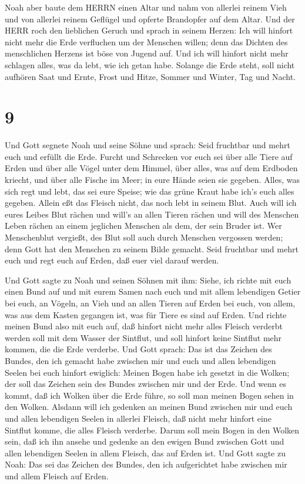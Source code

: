  Noah aber baute dem HERRN einen Altar und nahm von
allerlei reinem Vieh und von allerlei reinem Geflügel und opferte
Brandopfer auf dem Altar.  Und der HERR roch den lieblichen
Geruch und sprach in seinem Herzen: Ich will hinfort nicht mehr die Erde
verfluchen um der Menschen willen; denn das Dichten des menschlichen
Herzens ist böse von Jugend auf. Und ich will hinfort nicht mehr
schlagen alles, was da lebt, wie ich getan habe.  Solange
die Erde steht, soll nicht aufhören Saat und Ernte, Frost und Hitze,
Sommer und Winter, Tag und Nacht.

\hypertarget{section-8}{%
\section{9}\label{section-8}}

 Und Gott segnete Noah und seine Söhne und sprach: Seid
fruchtbar und mehrt euch und erfüllt die Erde.  Furcht und
Schrecken vor euch sei über alle Tiere auf Erden und über alle Vögel
unter dem Himmel, über alles, was auf dem Erdboden kriecht, und über
alle Fische im Meer; in eure Hände seien sie gegeben. 
Alles, was sich regt und lebt, das sei eure Speise; wie das grüne Kraut
habe ich's euch alles gegeben.  Allein eßt das Fleisch
nicht, das noch lebt in seinem Blut.  Auch will ich eures
Leibes Blut rächen und will's an allen Tieren rächen und will des
Menschen Leben rächen an einem jeglichen Menschen als dem, der sein
Bruder ist.  Wer Menschenblut vergießt, des Blut soll auch
durch Menschen vergossen werden; denn Gott hat den Menschen zu seinem
Bilde gemacht.  Seid fruchtbar und mehrt euch und regt euch
auf Erden, daß euer viel darauf werden.

 Und Gott sagte zu Noah und seinen Söhnen mit ihm:
 Siehe, ich richte mit euch einen Bund auf und mit eurem
Samen nach euch  und mit allem lebendigen Getier bei euch,
an Vögeln, an Vieh und an allen Tieren auf Erden bei euch, von allem,
was aus dem Kasten gegangen ist, was für Tiere es sind auf Erden.
 Und richte meinen Bund also mit euch auf, daß hinfort
nicht mehr alles Fleisch verderbt werden soll mit dem Wasser der
Sintflut, und soll hinfort keine Sintflut mehr kommen, die die Erde
verderbe.  Und Gott sprach: Das ist das Zeichen des Bundes,
den ich gemacht habe zwischen mir und euch und allen lebendigen Seelen
bei euch hinfort ewiglich:  Meinen Bogen habe ich gesetzt
in die Wolken; der soll das Zeichen sein des Bundes zwischen mir und der
Erde.  Und wenn es kommt, daß ich Wolken über die Erde
führe, so soll man meinen Bogen sehen in den Wolken. 
Alsdann will ich gedenken an meinen Bund zwischen mir und euch und allen
lebendigen Seelen in allerlei Fleisch, daß nicht mehr hinfort eine
Sintflut komme, die alles Fleisch verderbe.  Darum soll
mein Bogen in den Wolken sein, daß ich ihn ansehe und gedenke an den
ewigen Bund zwischen Gott und allen lebendigen Seelen in allem Fleisch,
das auf Erden ist.  Und Gott sagte zu Noah: Das sei das
Zeichen des Bundes, den ich aufgerichtet habe zwischen mir und allem
Fleisch auf Erden.

